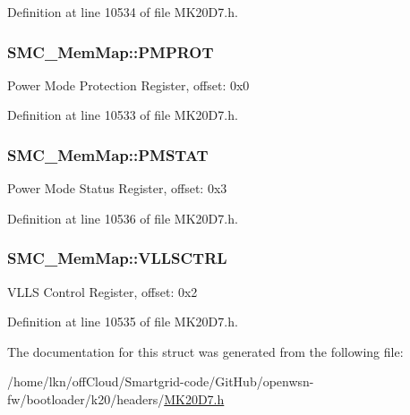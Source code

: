 Definition at line 10534 of file M\+K20\+D7.\+h.

\subsubsection[{\texorpdfstring{P\+M\+P\+R\+OT}{PMPROT}}]{ S\+M\+C\+\_\+\+Mem\+Map\+::\+P\+M\+P\+R\+OT}\hypertarget{struct_s_m_c___mem_map_afd03d93a7823dc65f53216dca15a2a95}{}\label{struct_s_m_c___mem_map_afd03d93a7823dc65f53216dca15a2a95}
Power Mode Protection Register, offset\+: 0x0 

Definition at line 10533 of file M\+K20\+D7.\+h.

\subsubsection[{\texorpdfstring{P\+M\+S\+T\+AT}{PMSTAT}}]{ S\+M\+C\+\_\+\+Mem\+Map\+::\+P\+M\+S\+T\+AT}\hypertarget{struct_s_m_c___mem_map_a0fddef87e229c4cf1b3be0d29589e964}{}\label{struct_s_m_c___mem_map_a0fddef87e229c4cf1b3be0d29589e964}
Power Mode Status Register, offset\+: 0x3 

Definition at line 10536 of file M\+K20\+D7.\+h.

\subsubsection[{\texorpdfstring{V\+L\+L\+S\+C\+T\+RL}{VLLSCTRL}}]{ S\+M\+C\+\_\+\+Mem\+Map\+::\+V\+L\+L\+S\+C\+T\+RL}\hypertarget{struct_s_m_c___mem_map_ad5b37041739800b7bb7afc59d53c7ded}{}\label{struct_s_m_c___mem_map_ad5b37041739800b7bb7afc59d53c7ded}
V\+L\+LS Control Register, offset\+: 0x2 

Definition at line 10535 of file M\+K20\+D7.\+h.



The documentation for this struct was generated from the following file\+:\begin{DoxyCompactItemize}
\item 
/home/lkn/off\+Cloud/\+Smartgrid-\/code/\+Git\+Hub/openwsn-\/fw/bootloader/k20/headers/\hyperlink{bootloader_2k20_2headers_2_m_k20_d7_8h}{M\+K20\+D7.\+h}\end{DoxyCompactItemize}
